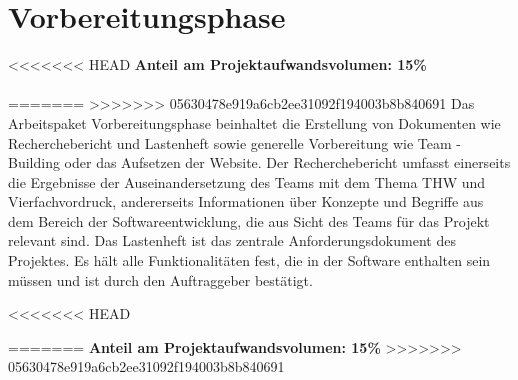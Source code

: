 \section{Vorbereitungsphase}
<<<<<<< HEAD
\textbf{Anteil am Projektaufwandsvolumen: 15\%}\\ \\
=======
>>>>>>> 05630478e919a6cb2ee31092f194003b8b840691
Das Arbeitspaket Vorbereitungsphase beinhaltet die Erstellung von Dokumenten 
wie Recherchebericht und Lastenheft sowie generelle Vorbereitung wie Team
-Building oder das Aufsetzen der Website.
Der Recherchebericht umfasst einerseits die Ergebnisse der Auseinandersetzung 
des Teams mit dem Thema THW und Vierfachvordruck, andererseits Informationen 
über Konzepte und Begriffe aus dem Bereich der Softwareentwicklung, die aus 
Sicht des Teams für das Projekt relevant sind.
Das Lastenheft ist das zentrale Anforderungsdokument des Projektes. Es hält 
alle Funktionalitäten fest, die in der Software enthalten sein müssen und 
ist durch den Auftraggeber bestätigt.

<<<<<<< HEAD

=======
\textbf{Anteil am Projektaufwandsvolumen: 15\%}
>>>>>>> 05630478e919a6cb2ee31092f194003b8b840691
